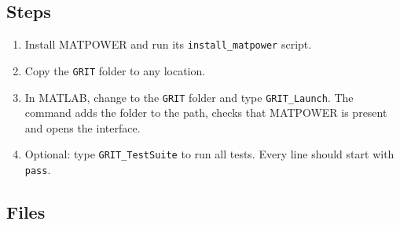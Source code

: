 \documentclass[a4paper,11pt]{article}
\begin{document}
\subsection{Steps}

\begin{enumerate}[nosep]
  \item Install MATPOWER and run its \texttt{install\_matpower} script.
  \item Copy the \texttt{GRIT} folder to any location.
  \item In MATLAB, change to the \texttt{GRIT} folder and type \texttt{GRIT\_Launch}. The command adds the folder to the path, checks that MATPOWER is present and opens the interface.
  \item Optional: type \texttt{GRIT\_TestSuite} to run all tests. Every line should start with \texttt{pass}.
\end{enumerate}

\subsection{Files}
\end{document}
